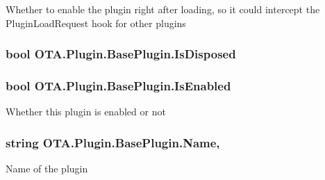 Whether to enable the plugin right after loading, so it could intercept the Plugin\+Load\+Request hook for other plugins 

\hypertarget{class_o_t_a_1_1_plugin_1_1_base_plugin_aa2648c127cf574f711a4cc7dcceace5f}{}
\subsubsection[{Is\+Disposed}]{\setlength{\rightskip}{0pt plus 5cm}bool O\+T\+A.\+Plugin.\+Base\+Plugin.\+Is\+Disposed\hspace{0.3cm}{\ttfamily [get]}}\label{class_o_t_a_1_1_plugin_1_1_base_plugin_aa2648c127cf574f711a4cc7dcceace5f}
\hypertarget{class_o_t_a_1_1_plugin_1_1_base_plugin_a41182d2756dbb8db45e322b6f90a1a7e}{}
\subsubsection[{Is\+Enabled}]{\setlength{\rightskip}{0pt plus 5cm}bool O\+T\+A.\+Plugin.\+Base\+Plugin.\+Is\+Enabled\hspace{0.3cm}{\ttfamily [get]}}\label{class_o_t_a_1_1_plugin_1_1_base_plugin_a41182d2756dbb8db45e322b6f90a1a7e}


Whether this plugin is enabled or not 

\hypertarget{class_o_t_a_1_1_plugin_1_1_base_plugin_a1cc8b14161cbe1f3cbd260dfcfe3e6da}{}
\subsubsection[{Name}]{\setlength{\rightskip}{0pt plus 5cm}string O\+T\+A.\+Plugin.\+Base\+Plugin.\+Name\hspace{0.3cm}{\ttfamily [get]}, {\ttfamily [set]}}\label{class_o_t_a_1_1_plugin_1_1_base_plugin_a1cc8b14161cbe1f3cbd260dfcfe3e6da}


Name of the plugin 

\hypertarget{class_o_t_a_1_1_plugin_1_1_base_plugin_a4d1e8d62e6d29cbb64146e5aa8b1c408}{}
